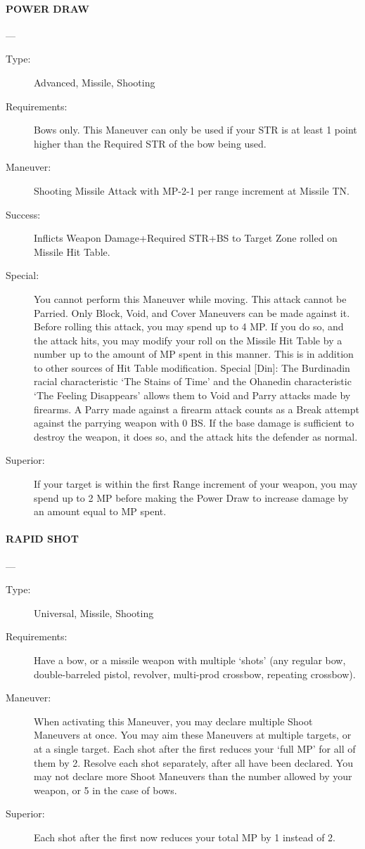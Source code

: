 \documentclass[oneside,11pt,english]{book}
\begin{document}
\paragraph{\large\label{man:POWER DRAW} POWER DRAW}---\quad{\large[???????]}
\vspace{-10pt}\begin{description} 
\item [Type:] Advanced, Missile, Shooting 
\item [Requirements:] Bows only. This Maneuver can only be used if your STR is at least 1 point higher than 
the Required STR of the bow being used. 
\item [Maneuver:] Shooting Missile Attack with MP-2-1 per range increment at Missile TN. 
\item [Success:] Inflicts Weapon Damage+Required STR+BS to Target Zone rolled on Missile Hit Table. 
\item [Special:] You cannot perform this Maneuver while moving. 
This attack cannot be Parried. Only Block, Void, and Cover Maneuvers can be made against it. 
Before rolling this attack, you may spend up to 4 MP. If you do so, and the attack hits, you may modify 
your roll on the Missile Hit Table by a number up to the amount of MP spent in this manner. This is in 
addition to other sources of Hit Table modification. 
Special [Din]: The Burdinadin racial characteristic ‘The Stains of Time’ and the Ohanedin characteristic 
‘The Feeling Disappears’ allows them to Void and Parry attacks made by firearms. A Parry made against 
a firearm attack counts as a Break attempt against the parrying weapon with 0 BS. If the base damage is 
sufficient to destroy the weapon, it does so, and the attack hits the defender as normal. 
\item [Superior:] If your target is within the first Range increment of your weapon, you may spend up to 2 MP 
before making the Power Draw to increase damage by an amount equal to MP spent. 
\end{description}
\paragraph{\large\label{man:RAPID SHOT} RAPID SHOT}---\quad{\large[???????]}
\vspace{-10pt}\begin{description} 
\item [Type:] Universal, Missile, Shooting 
\item [Requirements:] Have a bow, or a missile weapon with multiple ‘shots’ (any regular bow, double-barreled 
pistol, revolver, multi-prod crossbow, repeating crossbow). 
\item [Maneuver:] When activating this Maneuver, you may declare multiple Shoot Maneuvers at once. You 
may aim these Maneuvers at multiple targets, or at a single target. Each shot after the first reduces your 
‘full MP’ for all of them by 2. Resolve each shot separately, after all have been declared. You may not 
declare more Shoot Maneuvers than the number allowed by your weapon, or 5 in the case of bows. 
\item [Superior:] Each shot after the first now reduces your total MP by 1 instead of 2. 
\end{description}
\end{document}
